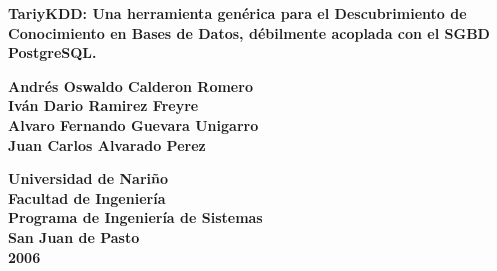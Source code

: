 \pagestyle{empty}
\begin{center}
\textbf{TariyKDD: Una herramienta gen\'erica para el Descubrimiento de Conocimiento en Bases de Datos, d\'ebilmente acoplada con el SGBD PostgreSQL.}\end{center}
\vspace*{5cm}
\begin{center}
\textbf{Andr\'es Oswaldo Calderon Romero \\
Iv\'an Dario Ramirez Freyre \\
Alvaro Fernando Guevara Unigarro \\
Juan Carlos Alvarado Perez}\end{center}
\vspace*{6cm}
\begin{center}
\textbf{Universidad de Nari\~no \\ 
Facultad de Ingenier\'ia\\
Programa de Ingenier\'ia de Sistemas\\
San Juan de Pasto\\
2006}\end{center}
